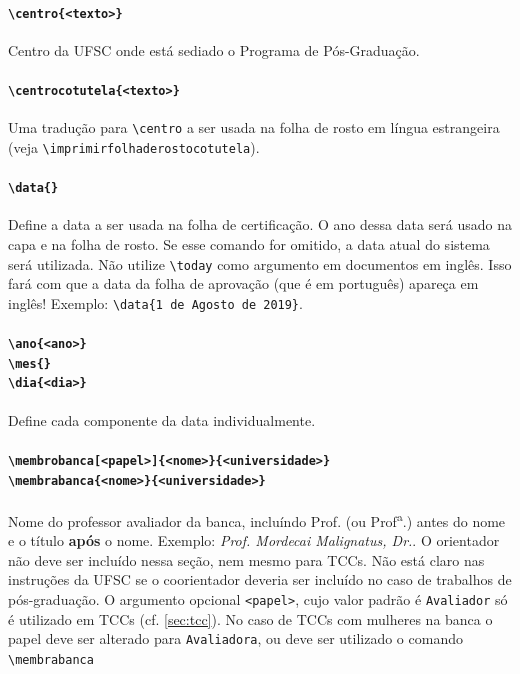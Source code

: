 \documentclass[embeddedlogo]{ufsc-thesis-rn46-2019}
\newcommand{\lacmd}[1]{\texttt{\textbackslash{}#1}}
\begin{document}
\paragraph*{\lacmd{centro\{<texto>\}}} Centro da UFSC onde está sediado o
Programa de Pós-Graduação.

\paragraph*{\lacmd{centrocotutela\{<texto>\}}} Uma tradução para
\lacmd{centro} a ser usada na folha de rosto em língua estrangeira (veja
\lacmd{imprimirfolhaderostocotutela}).

\paragraph*{\lacmd{data\{<data por extenso>\}}} Define a data a ser usada na
folha de certificação. O ano dessa data será usado na capa e na folha de
rosto. Se esse comando for omitido, a data atual do sistema será utilizada. Não
utilize \lacmd{today} como argumento em documentos em inglês. Isso fará com que
a data da folha de aprovação (que é em português) apareça em inglês! Exemplo:
\lacmd{data\{1 de Agosto de 2019\}}.

\paragraph*{\lacmd{ano\{<ano>\}} \\
            \lacmd{mes\{<nome do mes>\}} \\
            \lacmd{dia\{<dia>\}}}
Define cada componente da data individualmente.

\paragraph*{\lacmd{membrobanca[<papel>]\{<nome>\}\{<universidade>\}} \\
            \lacmd{membrabanca\{<nome>\}\{<universidade>\}}}
Nome do professor avaliador da banca, incluíndo Prof. (ou
Prof\textsuperscript{a}.) antes do nome e o título \textbf{após} o
nome. Exemplo: \emph{Prof. Mordecai Malignatus, Dr.}. O orientador não deve ser
incluído nessa seção, nem mesmo para TCCs. Não está claro nas instruções da UFSC
se o coorientador deveria ser incluído no caso de trabalhos de pós-graduação. O
argumento opcional \texttt{<papel>}, cujo valor padrão é \texttt{Avaliador} só é
utilizado em TCCs (cf. \autoref{sec:tcc}). No caso de TCCs com mulheres na banca
o papel deve ser alterado para \texttt{Avaliadora}, ou deve ser utilizado o
comando \lacmd{membrabanca}
\end{document}
